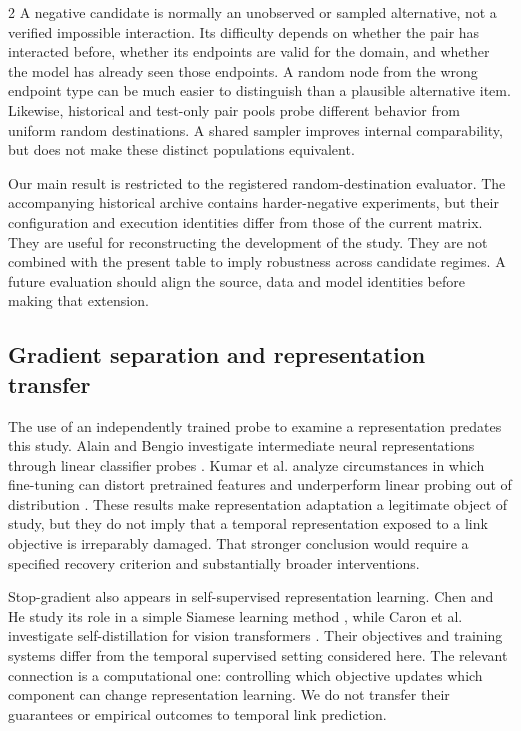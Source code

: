 \documentclass[a4paper,10pt]{article}
\begin{document}
\begin{multicols}{2}
A negative candidate is normally an unobserved or sampled alternative, not a verified impossible interaction. Its difficulty depends on whether the pair has interacted before, whether its endpoints are valid for the domain, and whether the model has already seen those endpoints. A random node from the wrong endpoint type can be much easier to distinguish than a plausible alternative item. Likewise, historical and test-only pair pools probe different behavior from uniform random destinations. A shared sampler improves internal comparability, but does not make these distinct populations equivalent.

Our main result is restricted to the registered random-destination evaluator. The accompanying historical archive contains harder-negative experiments, but their configuration and execution identities differ from those of the current matrix. They are useful for reconstructing the development of the study. They are not combined with the present table to imply robustness across candidate regimes. A future evaluation should align the source, data and model identities before making that extension.

\subsection{Gradient separation and representation transfer}
The use of an independently trained probe to examine a representation predates this study. Alain and Bengio investigate intermediate neural representations through linear classifier probes \cite{alain}. Kumar et al. analyze circumstances in which fine-tuning can distort pretrained features and underperform linear probing out of distribution \cite{kumar}. These results make representation adaptation a legitimate object of study, but they do not imply that a temporal representation exposed to a link objective is irreparably damaged. That stronger conclusion would require a specified recovery criterion and substantially broader interventions.

Stop-gradient also appears in self-supervised representation learning. Chen and He study its role in a simple Siamese learning method \cite{simsiam}, while Caron et al. investigate self-distillation for vision transformers \cite{dino}. Their objectives and training systems differ from the temporal supervised setting considered here. The relevant connection is a computational one: controlling which objective updates which component can change representation learning. We do not transfer their guarantees or empirical outcomes to temporal link prediction.


\end{multicols}
\end{document}
